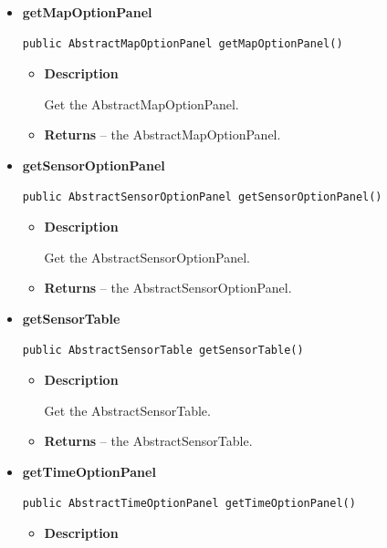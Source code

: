 {{{{{{{{{{{{{\begin{itemize}
{\begin{itemize}
{Get the AbstractMap.
}
\item{{\bf  Returns} -- 
the AbstractMap. 
}%
\end{itemize}
}%
\item{ 
\hypertarget{View.AbstractView.getMapOptionPanel()}{{\bf  getMapOptionPanel}\\}
\begin{lstlisting}[frame=none]
public AbstractMapOptionPanel getMapOptionPanel()\end{lstlisting} %
\begin{itemize}
\item{
{\bf  Description}

Get the AbstractMapOptionPanel.
}
\item{{\bf  Returns} -- 
the AbstractMapOptionPanel. 
}%
\end{itemize}
}%
\item{ 
\hypertarget{View.AbstractView.getSensorOptionPanel()}{{\bf  getSensorOptionPanel}\\}
\begin{lstlisting}[frame=none]
public AbstractSensorOptionPanel getSensorOptionPanel()\end{lstlisting} %
\begin{itemize}
\item{
{\bf  Description}

Get the AbstractSensorOptionPanel.
}
\item{{\bf  Returns} -- 
the AbstractSensorOptionPanel. 
}%
\end{itemize}
}%
\item{ 
\hypertarget{View.AbstractView.getSensorTable()}{{\bf  getSensorTable}\\}
\begin{lstlisting}[frame=none]
public AbstractSensorTable getSensorTable()\end{lstlisting} %
\begin{itemize}
\item{
{\bf  Description}

Get the AbstractSensorTable.
}
\item{{\bf  Returns} -- 
the AbstractSensorTable. 
}%
\end{itemize}
}%
\item{ 
\hypertarget{View.AbstractView.getTimeOptionPanel()}{{\bf  getTimeOptionPanel}\\}
\begin{lstlisting}[frame=none]
public AbstractTimeOptionPanel getTimeOptionPanel()\end{lstlisting} %
\begin{itemize}
\item{
{\bf  Description}

}
\end{itemize}}
\end{itemize}}}}}}}}}}}}}}
